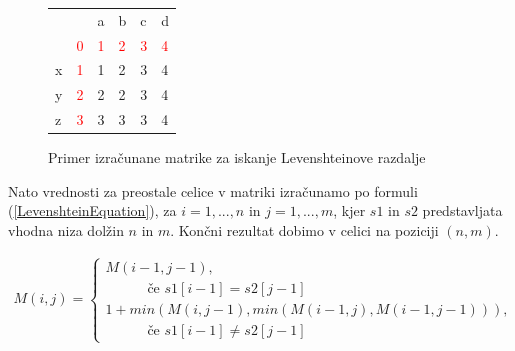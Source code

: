 \documentclass[a4paper,12pt,openright]{book}
\begin{document}
\begin{figure}[htb]
\begin{center}
\begin{tabular}{|l|l|l|l|l|l|}
\cline{3-6}
  \multicolumn{2}{c|}{}  & a & b & c & d\\ \cline{2-6}
 \multicolumn{1}{c|}{} & \textcolor{red}{0} & \textcolor{red}{1} & \textcolor{red}{2} & \textcolor{red}{3} & \textcolor{red}{4}\\ \hline
x  & \textcolor{red}{1}  & \cellcolor{blue!15}1 &  2 & 3 & 4\\ \hline
y  & \textcolor{red}{2} & 2 & \cellcolor{blue!15}2 & 3 & 4\\ \hline
z  & \textcolor{red}{3} & 3 & 3 & \cellcolor{blue!15}3 & \cellcolor{blue!25}4 \\ \hline
\end{tabular}

\end{center}
\caption{Primer izračunane matrike za iskanje Levenshteinove razdalje}
\label{levenshteinExample}
\end{figure}


Nato vrednosti za preostale celice v matriki izračunamo po formuli (\ref{LevenshteinEquation}), za \begin{math}i=1,...,n\end{math} in \begin{math}j=1,...,m\end{math}, kjer \begin{math}s1\end{math} in \begin{math}s2\end{math} predstavljata vhodna niza dolžin \begin{math}n\end{math} in \begin{math}m\end{math}. Končni rezultat dobimo v celici na poziciji \begin{math}(n, m)\end{math}. 

\begin{equation}
\label{LevenshteinEquation}
\begin{aligned}
M(i, j) =
\begin{cases}
     M(i-1, j-1) ,     \\ \quad \quad \quad \text{če } s1[i-1]=s2[j-1]\\
     1 + min(M(i, j-1), min(M(i-1, j), M(i-1, j-1))) , \\ \quad \quad \quad \text{če } s1[i-1] \neq s2[j-1]
  \end{cases}
\end{aligned}
\end{equation}
\end{document}
